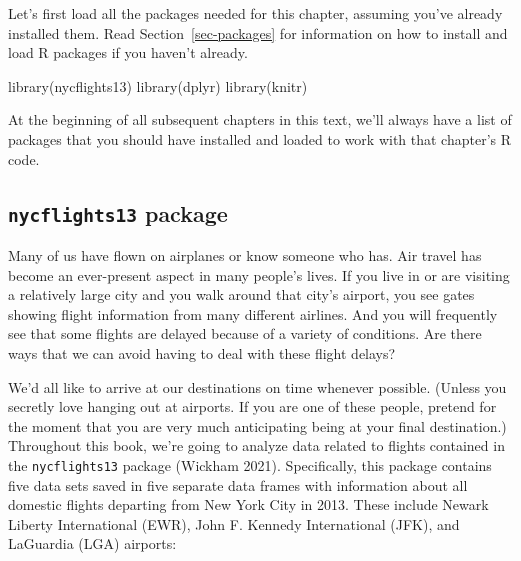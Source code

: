 \documentclass[
  letterpaper,
  DIV=11,
  numbers=noendperiod]{scrreprt}
\newenvironment{Shaded}{\begin{snugshade}}{\end{snugshade}}
\newcommand{\FunctionTok}[1]{\textcolor[rgb]{0.28,0.35,0.67}{#1}}
\newcommand{\NormalTok}[1]{\textcolor[rgb]{0.00,0.23,0.31}{#1}}
\theoremstyle{definition}
\theoremstyle{remark}
\begin{document}
Let's first load all the packages needed for this chapter, assuming
you've already installed them. Read Section~\ref{sec-packages} for
information on how to install and load R packages if you haven't
already.

\begin{Shaded}
\begin{Highlighting}[]
\FunctionTok{library}\NormalTok{(nycflights13)}
\FunctionTok{library}\NormalTok{(dplyr)}
\FunctionTok{library}\NormalTok{(knitr)}
\end{Highlighting}
\end{Shaded}

At the beginning of all subsequent chapters in this text, we'll always
have a list of packages that you should have installed and loaded to
work with that chapter's R code.

\hypertarget{nycflights13-package}{%
\subsection{\texorpdfstring{\texttt{nycflights13}
package}{nycflights13 package}}\label{nycflights13-package}}

Many of us have flown on airplanes or know someone who has. Air travel
has become an ever-present aspect in many people's lives. If you live in
or are visiting a relatively large city and you walk around that city's
airport, you see gates showing flight information from many different
airlines. And you will frequently see that some flights are delayed
because of a variety of conditions. Are there ways that we can avoid
having to deal with these flight delays?

We'd all like to arrive at our destinations on time whenever possible.
(Unless you secretly love hanging out at airports. If you are one of
these people, pretend for the moment that you are very much anticipating
being at your final destination.) Throughout this book, we're going to
analyze data related to flights contained in the \texttt{nycflights13}
package (Wickham 2021). Specifically, this package contains five data
sets saved in five separate data frames with information about all
domestic flights departing from New York City in 2013. These include
Newark Liberty International (EWR), John F. Kennedy International (JFK),
and LaGuardia (LGA) airports:
\end{document}
